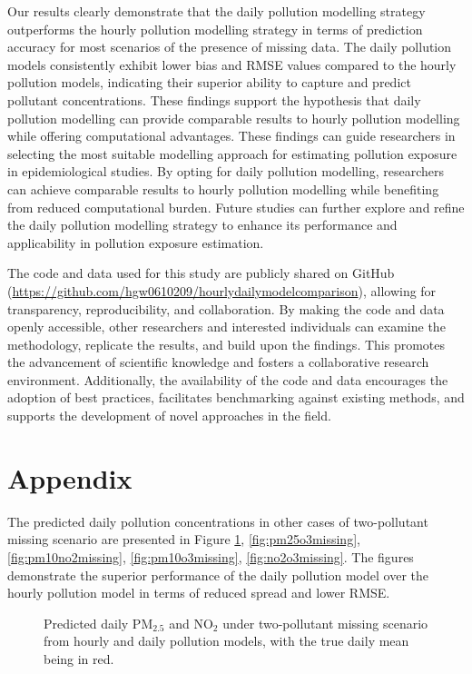 \documentclass[
  12,
]{article}
\begin{document}
Our results clearly demonstrate that the daily pollution modelling
strategy outperforms the hourly pollution modelling strategy in terms of
prediction accuracy for most scenarios of the presence of missing data.
The daily pollution models consistently exhibit lower bias and RMSE
values compared to the hourly pollution models, indicating their
superior ability to capture and predict pollutant concentrations. These
findings support the hypothesis that daily pollution modelling can
provide comparable results to hourly pollution modelling while offering
computational advantages. These findings can guide researchers in
selecting the most suitable modelling approach for estimating pollution
exposure in epidemiological studies. By opting for daily pollution
modelling, researchers can achieve comparable results to hourly
pollution modelling while benefiting from reduced computational burden.
Future studies can further explore and refine the daily pollution
modelling strategy to enhance its performance and applicability in
pollution exposure estimation.

The code and data used for this study are publicly shared on GitHub
(\url{https://github.com/hgw0610209/hourlydailymodelcomparison}),
allowing for transparency, reproducibility, and collaboration. By making
the code and data openly accessible, other researchers and interested
individuals can examine the methodology, replicate the results, and
build upon the findings. This promotes the advancement of scientific
knowledge and fosters a collaborative research environment.
Additionally, the availability of the code and data encourages the
adoption of best practices, facilitates benchmarking against existing
methods, and supports the development of novel approaches in the field.

\hypertarget{appendix}{%
\section*{Appendix}\label{appendix}}

The predicted daily pollution concentrations in other cases of
two-pollutant missing scenario are presented in Figure
\ref{fig:pm25no2missing}, \ref{fig:pm25o3missing},
\ref{fig:pm10no2missing}, \ref{fig:pm10o3missing},
\ref{fig:no2o3missing}. The figures demonstrate the superior performance
of the daily pollution model over the hourly pollution model in terms of
reduced spread and lower RMSE.

\begin{figure}[H]
\caption{Predicted daily PM$_{2.5}$ and NO$_{2}$ under two-pollutant missing scenario from hourly and daily pollution models, with the true daily mean being in red.}\label{fig:pm25no2missing}
\end{figure}
\end{document}
